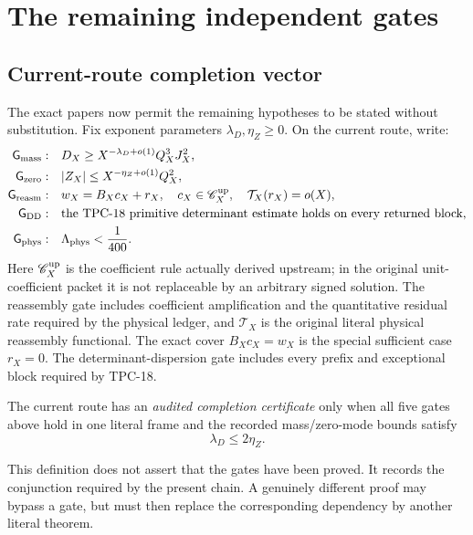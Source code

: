 \section{The remaining independent gates}
\label{sec:independent-gates}

\subsection{Current-route completion vector}

The exact papers now permit the remaining hypotheses to be stated
without substitution.  Fix exponent parameters
\(\lambda_D,\eta_Z\ge0\).  On the current route, write:
\begin{align*}
\mathsf G_{\rm mass}:\quad&
D_X\ge
X^{-\lambda_D+o(1)}Q_X^3J_X^2,
\\
\mathsf G_{\rm zero}:\quad&
|Z_X|\le X^{-\eta_Z+o(1)}Q_X^2,
\\
\mathsf G_{\rm reasm}:\quad&
w_X=B_Xc_X+r_X,\quad c_X\in\mathscr C_X^{\rm up},\quad
\mathcal T_X(r_X)=o(X),
\\
\mathsf G_{\rm DD}:\quad&
\text{the TPC-18 primitive determinant estimate holds on every
returned block},
\\
\mathsf G_{\rm phys}:\quad&
\Lambda_{\rm phys}<\frac1{400}.
\end{align*}
Here \(\mathscr C_X^{\rm up}\) is the coefficient rule actually
derived upstream; in the original unit-coefficient packet it is not
replaceable by an arbitrary signed solution.  The reassembly gate
includes coefficient amplification and the quantitative residual
rate required by the physical ledger, and \(\mathcal T_X\) is the
original literal physical reassembly functional.  The exact cover
\(B_Xc_X=w_X\) is the special sufficient case \(r_X=0\).
The determinant-dispersion gate includes every prefix and exceptional
block required by TPC-18.

\begin{definition}
\label{def:completion-conjunction}
The current route has an \emph{audited completion certificate} only
when all five gates above hold in one literal frame and the recorded
mass/zero-mode bounds satisfy
\begin{equation}
 \lambda_D\le2\eta_Z.
 \label{eq:determinant-compatibility}
\end{equation}
\end{definition}

This definition does not assert that the gates have been proved.  It
records the conjunction required by the present chain.  A genuinely
different proof may bypass a gate, but must then replace the
corresponding dependency by another literal theorem.


